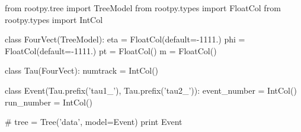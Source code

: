 \begin{footnotesize}
\begin{pyglist}[language=python,texcl=true,abovecaptionskip=0,style=vs,bgcolor=Moccasin]
from rootpy.tree import TreeModel
from rootpy.types import FloatCol
from rootpy.types import IntCol

class FourVect(TreeModel):
    eta = FloatCol(default=-1111.)
    phi = FloatCol(default=-1111.)
    pt = FloatCol()
    m = FloatCol()

class Tau(FourVect):
    numtrack = IntCol()

class Event(Tau.prefix('tau1_'),
            Tau.prefix('tau2_')):
    event_number = IntCol()
    run_number = IntCol()

# tree = Tree('data', model=Event)
print Event
\end{pyglist}
\end{footnotesize}
